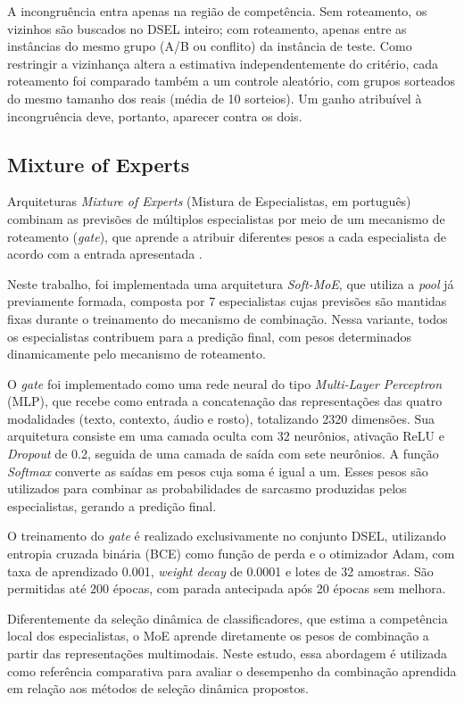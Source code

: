 \documentclass[conference]{IEEEtran}
\begin{document}
A incongruência entra apenas na região de competência. Sem roteamento, os vizinhos são buscados no DSEL inteiro; com roteamento, apenas entre as instâncias do mesmo grupo (A/B ou conflito) da instância de teste. Como restringir a vizinhança altera a estimativa independentemente do critério, cada roteamento foi comparado também a um controle aleatório, com grupos sorteados do mesmo tamanho dos reais (média de 10 sorteios). Um ganho atribuível à incongruência deve, portanto, aparecer contra os dois.


\subsection{Mixture of Experts}

Arquiteturas \textit{Mixture of Experts} (Mistura de Especialistas, em português) combinam as previsões de múltiplos especialistas por meio de um mecanismo de roteamento (\textit{gate}), que aprende a atribuir diferentes pesos a cada especialista de acordo com a entrada apresentada \cite{jacobs1991adaptive}.

Neste trabalho, foi implementada uma arquitetura \textit{Soft-MoE}, que utiliza a \textit{pool} já previamente formada, composta por 7 especialistas cujas previsões são mantidas fixas durante o treinamento do mecanismo de combinação. Nessa variante, todos os especialistas contribuem para a predição final, com pesos determinados dinamicamente pelo mecanismo de roteamento.

O \textit{gate} foi implementado como uma rede neural do tipo \textit{Multi-Layer Perceptron} (MLP), que recebe como entrada a concatenação das representações das quatro modalidades (texto, contexto, áudio e rosto), totalizando 2320 dimensões. Sua arquitetura consiste em uma camada oculta com 32 neurônios, ativação ReLU e \textit{Dropout} de 0.2, seguida de uma camada de saída com sete neurônios. A função \textit{Softmax} converte as saídas em pesos cuja soma é igual a um. Esses pesos são utilizados para combinar as probabilidades de sarcasmo produzidas pelos especialistas, gerando a predição final.

O treinamento do \textit{gate} é realizado exclusivamente no conjunto DSEL, utilizando entropia cruzada binária (BCE) como função de perda e o otimizador Adam, com taxa de aprendizado 0.001, \textit{weight decay} de 0.0001 e lotes de 32 amostras. São permitidas até 200 épocas, com parada antecipada após 20 épocas sem melhora.

Diferentemente da seleção dinâmica de classificadores, que estima a competência local dos especialistas, o MoE aprende diretamente os pesos de combinação a partir das representações multimodais. Neste estudo, essa abordagem é utilizada como referência comparativa para avaliar o desempenho da combinação aprendida em relação aos métodos de seleção dinâmica propostos.
\end{document}
